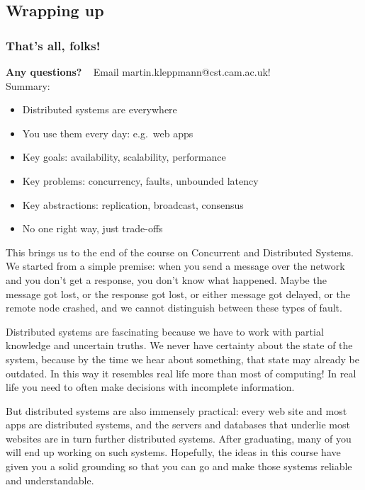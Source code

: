 \newpage
\subsection{Wrapping up}

\begin{frame}
    \label{s:conclusions}
    \frametitle{That's all, folks!}
    \textbf{Any questions?} ~ Email martin.kleppmann@cst.cam.ac.uk!\\[1em]
    Summary:
    \begin{itemize}
        \item Distributed systems are everywhere
        \item You use them every day: e.g.\ web apps
        \item Key goals: availability, scalability, performance
        \item Key problems: concurrency, faults, unbounded latency
        \item Key abstractions: replication, broadcast, consensus
        \item No one right way, just trade-offs\\[1em]
    \end{itemize}
\end{frame}
\label{l:conclusions}

This brings us to the end of the course on Concurrent and Distributed Systems.
We started from a simple premise: when you send a message over the network and you don't get a response, you don't know what happened.
Maybe the message got lost, or the response got lost, or either message got delayed, or the remote node crashed, and we cannot distinguish between these types of fault.

Distributed systems are fascinating because we have to work with partial knowledge and uncertain truths.
We never have certainty about the state of the system, because by the time we hear about something, that state may already be outdated.
In this way it resembles real life more than most of computing!
In real life you need to often make decisions with incomplete information.

But distributed systems are also immensely practical: every web site and most apps are distributed systems, and the servers and databases that underlie most websites are in turn further distributed systems.
After graduating, many of you will end up working on such systems.
Hopefully, the ideas in this course have given you a solid grounding so that you can go and make those systems reliable and understandable.


\footnotesize

{}

